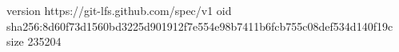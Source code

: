 version https://git-lfs.github.com/spec/v1
oid sha256:8d60f73d1560bd3225d901912f7e554e98b7411b6fcb755c08def534d140f19c
size 235204
